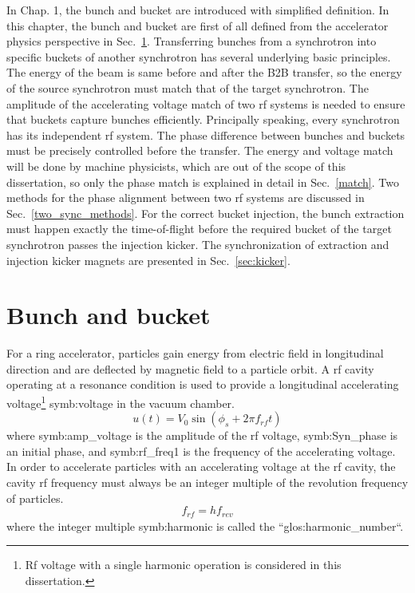 In Chap. 1, the bunch and bucket are introduced with simplified definition. In this chapter, the bunch and bucket are first of all defined from the accelerator physics perspective in Sec.~\ref{bunch and bucket}. Transferring bunches from a synchrotron into specific buckets of another synchrotron has several underlying basic principles. The energy of the beam is same before and after the B2B transfer, so the energy of the source synchrotron must match that of the target synchrotron. The amplitude of the accelerating voltage match of two rf systems is needed to ensure that buckets capture bunches efficiently. Principally speaking, every synchrotron has its independent rf system. The phase difference between bunches and buckets must be precisely controlled before the transfer. The energy and voltage match will be done by machine physicists, which are out of the scope of this dissertation, so only the phase match is explained in detail in Sec.~\ref{match}. Two methods for the phase alignment between two rf systems are discussed in Sec.~\ref{two_sync_methods}. For the correct bucket injection, the bunch extraction must happen exactly the time-of-flight before the required bucket of the target synchrotron passes the injection kicker. The synchronization of extraction and injection kicker magnets are presented in Sec.~\ref{sec:kicker}.

\section{Bunch and bucket}
\label{bunch and bucket}
For a ring accelerator, particles gain energy from electric field in longitudinal direction and are deflected by magnetic field to a particle orbit. A rf cavity operating at a resonance condition is used to provide a longitudinal accelerating voltage\footnote{Rf voltage with a single harmonic operation is considered in this dissertation.} \gls{symb:voltage} in the vacuum chamber.
\begin{equation}
u(t)=V_0\sin(\phi_\mathit{s}+2\pi f_\mathit{rf}t)
\end{equation}
where \gls{symb:amp_voltage} is the amplitude of the rf voltage, \gls{symb:Syn_phase} is an initial phase, and \gls{symb:rf_freq1} is the frequency of the accelerating voltage. In order to accelerate particles with an accelerating voltage at the rf cavity, the cavity rf frequency must always be an integer multiple of the revolution frequency of particles. 
\begin{equation}
	f_{\mathit{rf}}=hf_{\mathit{rev}}\label{harmonic_number}
\end{equation}
where the integer multiple \gls{symb:harmonic} is called the ``\gls{glos:harmonic_number}``. 

